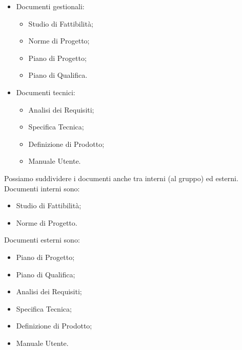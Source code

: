 \documentclass[a4paper]{article}
\begin{document}
	\begin{itemize}
		
			
	\item Documenti gestionali:
				
	\begin{itemize}
		
					
	\item Studio di Fattibilità;
					
	\item Norme di Progetto;
					
	\item Piano di Progetto;
					
	\item Piano di Qualifica.
				
	\end{itemize}

			
			
	\item Documenti tecnici:
				
	\begin{itemize}
		
					
	\item Analisi dei Requisiti;
					
	\item Specifica Tecnica;
					
	\item Definizione di Prodotto;
					
	\item Manuale Utente.
				
	\end{itemize}

			
		
	\end{itemize}

		
Possiamo suddividere i documenti anche tra interni (al gruppo) ed esterni. Documenti interni sono:
		
	\begin{itemize}
		
			
	\item Studio di Fattibilità;
			
	\item Norme di Progetto.
		
	\end{itemize}

		
Documenti esterni sono:
		
	\begin{itemize}
		
			
	\item Piano di Progetto;
			
	\item Piano di Qualifica;
			
	\item Analisi dei Requisiti;
			
	\item Specifica Tecnica;
			
	\item Definizione di Prodotto;
			
	\item Manuale Utente.
		
	\end{itemize}
\end{document}
